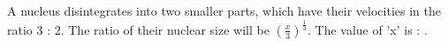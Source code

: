 \item A nucleus disintegrates into two smaller parts, which have their velocities in the ratio 3 : 2. The ratio of their nuclear size will be \(\left( \frac{x}{3} \right)^{\frac{1}{3}} \). The value of 'x' is : \underline{\hspace{2.5cm}}.

